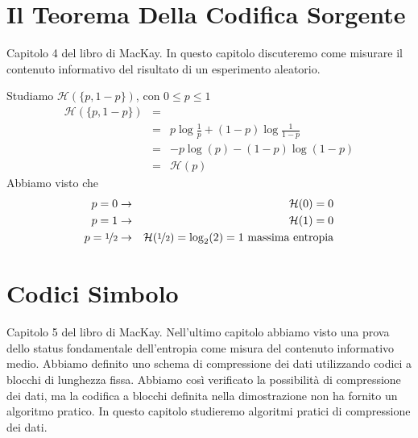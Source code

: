 \section{Il Teorema Della Codifica Sorgente}
Capitolo 4 del libro di MacKay. In questo capitolo discuteremo come misurare il contenuto informativo del risultato di un esperimento aleatorio.\bigskip

\noindent Studiamo $\mathcal{H}(\{p,1-p\})$, con $0\leq p\leq 1$
\begin{eqnarray*}
    \mathcal{H}(\{p,1-p\})  & = &\\
                            & = & p\log\frac{1}{p} + (1-p)\log\frac{1}{1-p}\\
                            & = & -p\log(p) - (1-p)\log(1-p)\\
                            & = & \mathcal{H}(p)
\end{eqnarray*}
Abbiamo visto che 
\begin{eqnarray*}
    p=0 &\to& \mathcal{H}(0)=0\\
    p=1 &\to& \mathcal{H}(1)=0\\
    p=\nicefrac{1}{2} &\to& \mathcal{H}(\nicefrac{1}{2})=\log_2(2)=1 \text{ massima entropia}
\end{eqnarray*}

\begin{center}
\end{center}








\section{Codici Simbolo}
Capitolo 5 del libro di MacKay. Nell'ultimo capitolo abbiamo visto una prova dello status fondamentale dell'entropia come misura del contenuto informativo medio. Abbiamo definito uno schema di compressione dei dati utilizzando codici a blocchi di lunghezza fissa. Abbiamo così verificato la possibilità di compressione dei dati, ma la codifica a blocchi definita nella dimostrazione non ha fornito un algoritmo pratico. In questo capitolo studieremo algoritmi pratici di compressione dei dati.

